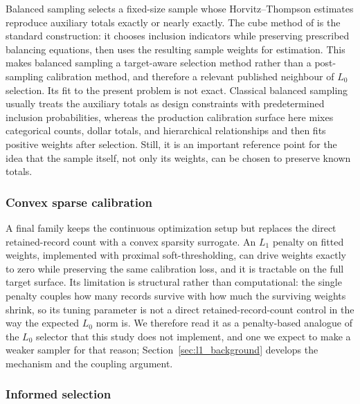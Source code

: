 Balanced sampling selects a fixed-size sample whose Horvitz--Thompson estimates reproduce auxiliary
totals exactly or nearly exactly. The cube method of \citet{deville2004cube} is the standard
construction: it chooses inclusion indicators while preserving prescribed balancing equations, then
uses the resulting sample weights for estimation. This makes balanced sampling a target-aware
selection method rather than a post-sampling calibration method, and therefore a relevant published
neighbour of $L_0$ selection. Its fit to the present problem is not exact. Classical balanced sampling
usually treats the auxiliary totals as design constraints with predetermined inclusion probabilities,
whereas the production calibration surface here mixes categorical counts, dollar totals, and
hierarchical relationships and then fits positive weights after selection. Still, it is an important
reference point for the idea that the sample itself, not only its weights, can be chosen to preserve
known totals.

\subsubsection{Convex sparse calibration}

A final family keeps the continuous optimization setup but replaces the direct retained-record count
with a convex sparsity surrogate. An $L_1$ penalty on fitted weights, implemented with proximal
soft-thresholding, can drive weights exactly to zero while preserving the same calibration loss, and it
is tractable on the full target surface. Its limitation is structural rather than computational: the
single penalty couples how many records survive with how much the surviving weights shrink, so its
tuning parameter is not a direct retained-record-count control in the way the expected $L_0$ norm is. We
therefore read it as a penalty-based analogue of the $L_0$ selector that this study does not implement,
and one we expect to make a weaker sampler for that reason; Section~\ref{sec:l1_background} develops the
mechanism and the coupling argument.

\subsubsection{Informed selection}

